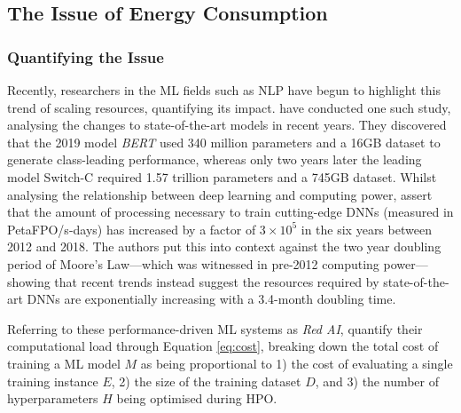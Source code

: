 \documentclass[a4paper, 12pt]{article}
\begin{document}
    \subsection{The Issue of Energy Consumption}

    \subsubsection{Quantifying the Issue}

    Recently, researchers in the ML fields such as NLP have begun to highlight this trend of scaling resources, quantifying its impact.  have conducted one such study, analysing the changes to state-of-the-art models in recent years. They discovered that the 2019 model \emph{BERT} \cite{devlin-2019} used 340 million parameters and a 16GB dataset to generate class-leading performance, whereas only two years later the leading model Switch-C \cite{fedus-2021} required 1.57 trillion parameters and a 745GB dataset. Whilst analysing the relationship between deep learning and computing power,  assert that the amount of processing necessary to train cutting-edge DNNs (measured in PetaFPO/s-days) has increased by a factor of $3 \times 10^5$ in the six years between 2012 and 2018. The authors put this into context against the two year doubling period of Moore's Law---which was witnessed in pre-2012 computing power---showing that recent trends instead suggest the resources required by state-of-the-art DNNs are exponentially increasing with a 3.4-month doubling time.

    Referring to these performance-driven ML systems as \emph{Red AI},  quantify their computational load through Equation \ref{eq:cost}, breaking down the total cost of training a ML model $M$ as being proportional to 1) the cost of evaluating a single training instance $E$, 2) the size of the training dataset $D$, and 3) the number of hyperparameters $H$ being optimised during HPO.
\end{document}
